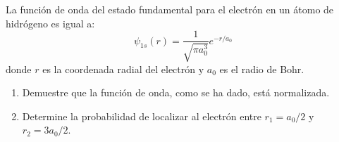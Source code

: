 \item La función de onda del estado fundamental para el electrón en un átomo de hidrógeno es igual a:
$$ \psi_{1s}(r) = \frac{1}{\sqrt{\pi a_0^3}} e^{-r/a_0} $$
donde $r$ es la coordenada radial del electrón y $a_0$ es el radio de Bohr.
\begin{enumerate}
    \item Demuestre que la función de onda, como se ha dado, está normalizada.
    \item Determine la probabilidad de localizar al electrón entre $r_1 = a_0/2$ y $r_2 = 3a_0/2$.
\end{enumerate}